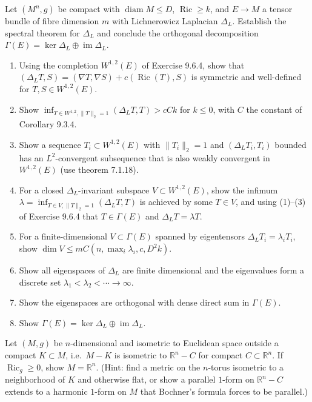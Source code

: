\begin{remark}[Exercise 9.6.5]
  \label{rem:pet-ch9-exercise-9-6-5}
  Let $(M^n,g)$ be compact with $\operatorname{diam}M\le D$, $\operatorname{Ric}\ge k$, and $E\to M$ a
  tensor bundle of fibre dimension $m$ with Lichnerowicz Laplacian $\Delta_L$.
  Establish the spectral theorem for $\Delta_L$ and conclude the orthogonal
  decomposition $\Gamma(E)=\ker\Delta_L\oplus\operatorname{im}\Delta_L$.
  \begin{enumerate}
    \item[(1)] Using the completion $W^{1,2}(E)$ of Exercise 9.6.4, show that
      $(\Delta_LT,S)=(\nabla T,\nabla S)+c(\operatorname{Ric}(T),S)$ is symmetric and
      well-defined for $T,S\in W^{1,2}(E)$.
    \item[(2)] Show $\inf_{T\in W^{1,2},\|T\|_2=1}(\Delta_LT,T)>cCk$ for $k\le0$,
      with $C$ the constant of Corollary 9.3.4.
    \item[(3)] Show a sequence $T_i\subset W^{1,2}(E)$ with $\|T_i\|_2=1$ and
      $(\Delta_LT_i,T_i)$ bounded has an $L^2$-convergent subsequence that is
      also weakly convergent in $W^{1,2}(E)$ (use theorem 7.1.18).
    \item[(4)] For a closed $\Delta_L$-invariant subspace $V\subset W^{1,2}(E)$,
      show the infimum $\lambda=\inf_{T\in V,\|T\|_2=1}(\Delta_LT,T)$ is
      achieved by some $T\in V$, and using (1)–(3) of Exercise 9.6.4 that
      $T\in\Gamma(E)$ and $\Delta_LT=\lambda T$.
    \item[(5)] For a finite-dimensional $V\subset\Gamma(E)$ spanned by
      eigentensors $\Delta_LT_i=\lambda_iT_i$, show
      $\dim V\le mC(n,\max_i\lambda_i,c,D^2k)$.
    \item[(6)] Show all eigenspaces of $\Delta_L$ are finite dimensional and
      the eigenvalues form a discrete set $\lambda_1<\lambda_2<\cdots\to\infty$.
    \item[(7)] Show the eigenspaces are orthogonal with dense direct sum in
      $\Gamma(E)$.
    \item[(8)] Show $\Gamma(E)=\ker\Delta_L\oplus\operatorname{im}\Delta_L$.
  \end{enumerate}
\end{remark}

\begin{remark}[Exercise 9.6.6]
  \label{rem:pet-ch9-exercise-9-6-6}
  Let $(M,g)$ be $n$-dimensional and isometric to Euclidean space outside a
  compact $K\subset M$, i.e.\ $M-K$ is isometric to $\mathbb{R}^n-C$ for compact
  $C\subset\mathbb{R}^n$. If $\operatorname{Ric}_g\ge0$, show $M=\mathbb{R}^n$. (Hint: find a metric on
  the $n$-torus isometric to a neighborhood of $K$ and otherwise flat, or show
  a parallel $1$-form on $\mathbb{R}^n-C$ extends to a harmonic $1$-form on $M$ that
  Bochner's formula forces to be parallel.)
\end{remark}

